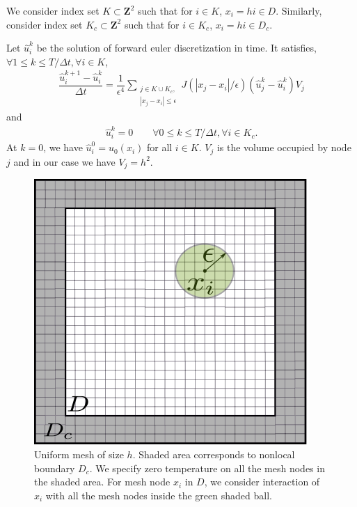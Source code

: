 \documentclass[11pt,twocolumn]{amsart}
\theoremstyle{definition}
\theoremstyle{definition}
\numberwithin{equation}{section}
\numberwithin{equation}{section}
\newcommand{\Z}{\mathbf{Z}}  %
\begin{document}
We consider index set $K \subset \Z^2$ such that for $i\in K$, $x_i = h i \in D$. Similarly, consider index set $K_c \subset \Z^2$ such that for $i\in K_c$, $x_i = h i \in D_c$.

Let $\hat{u}^k_i$ be the solution of forward euler discretization in time. It satisfies,$\forall 1\leq k \leq T/\Delta t, \forall i \in K$,
\begin{align}\label{eq:forward fd}
\dfrac{\hat{u}^{k+1}_i - \hat{u}^k_i}{\Delta t} = \dfrac{1}{\epsilon^4} \sum_{\substack{j \in K\cup K_c,\\
|x_j-x_i| \leq \epsilon}} J(|x_j - x_i|/\epsilon) (\hat{u}^k_j - \hat{u}^k_i) V_j
\end{align}
and
\begin{align}
\hat{u}^k_i = 0 \qquad \forall 0\leq k \leq T/\Delta t, \forall i \in K_c.
\end{align}
At $k=0$, we have $\hat{u}^0_i = u_0(x_i)$ for all $i\in K$. $V_j$ is the volume occupied by node $j$ and in our case we have $V_j = h^2$. 

\begin{figure}[ht]
\centering
\includegraphics[scale=0.6]{mesh_uniform.png}
\caption{Uniform mesh of size $h$. Shaded area corresponds to nonlocal boundary $D_c$. We specify zero temperature on all the mesh nodes in the shaded area. For mesh node $x_i$ in $D$, we consider interaction of $x_i$ with all the mesh nodes inside the green shaded ball.}\label{fig:mesh fd}
\end{figure}
\end{document}
